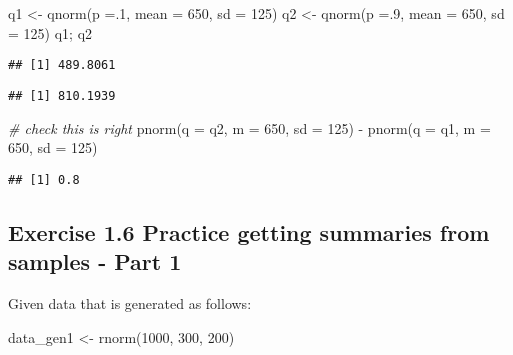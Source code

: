 \documentclass[
]{article}
\newenvironment{Shaded}{\begin{snugshade}}{\end{snugshade}}
\newcommand{\AttributeTok}[1]{\textcolor[rgb]{0.77,0.63,0.00}{#1}}
\newcommand{\CommentTok}[1]{\textcolor[rgb]{0.56,0.35,0.01}{\textit{#1}}}
\newcommand{\DecValTok}[1]{\textcolor[rgb]{0.00,0.00,0.81}{#1}}
\newcommand{\FunctionTok}[1]{\textcolor[rgb]{0.00,0.00,0.00}{#1}}
\newcommand{\NormalTok}[1]{#1}
\newcommand{\OtherTok}[1]{\textcolor[rgb]{0.56,0.35,0.01}{#1}}
\newcommand{\SpecialCharTok}[1]{\textcolor[rgb]{0.00,0.00,0.00}{#1}}
\begin{document}
\begin{Shaded}
\begin{Highlighting}[]
\NormalTok{q1 }\OtherTok{\textless{}{-}} \FunctionTok{qnorm}\NormalTok{(}\AttributeTok{p =}\NormalTok{.}\DecValTok{1}\NormalTok{,}
            \AttributeTok{mean =} \DecValTok{650}\NormalTok{, }\AttributeTok{sd =} \DecValTok{125}\NormalTok{)}
\NormalTok{q2 }\OtherTok{\textless{}{-}} \FunctionTok{qnorm}\NormalTok{(}\AttributeTok{p =}\NormalTok{.}\DecValTok{9}\NormalTok{,}
            \AttributeTok{mean =} \DecValTok{650}\NormalTok{, }\AttributeTok{sd =} \DecValTok{125}\NormalTok{)}
\NormalTok{q1; q2}
\end{Highlighting}
\end{Shaded}

\begin{verbatim}
## [1] 489.8061
\end{verbatim}

\begin{verbatim}
## [1] 810.1939
\end{verbatim}

\begin{Shaded}
\begin{Highlighting}[]
\CommentTok{\# check this is right}
\FunctionTok{pnorm}\NormalTok{(}\AttributeTok{q =}\NormalTok{ q2, }
      \AttributeTok{m =} \DecValTok{650}\NormalTok{, }\AttributeTok{sd =} \DecValTok{125}\NormalTok{) }\SpecialCharTok{{-}} \FunctionTok{pnorm}\NormalTok{(}\AttributeTok{q =}\NormalTok{ q1, }\AttributeTok{m =} \DecValTok{650}\NormalTok{, }\AttributeTok{sd =} \DecValTok{125}\NormalTok{)}
\end{Highlighting}
\end{Shaded}

\begin{verbatim}
## [1] 0.8
\end{verbatim}

\hypertarget{exercise-1.6-practice-getting-summaries-from-samples---part-1}{%
\subsection{Exercise 1.6 Practice getting summaries from samples - Part
1}\label{exercise-1.6-practice-getting-summaries-from-samples---part-1}}

Given data that is generated as follows:

\begin{Shaded}
\begin{Highlighting}[]
\NormalTok{data\_gen1 }\OtherTok{\textless{}{-}} \FunctionTok{rnorm}\NormalTok{(}\DecValTok{1000}\NormalTok{, }\DecValTok{300}\NormalTok{, }\DecValTok{200}\NormalTok{)}
\end{Highlighting}
\end{Shaded}
\end{document}
